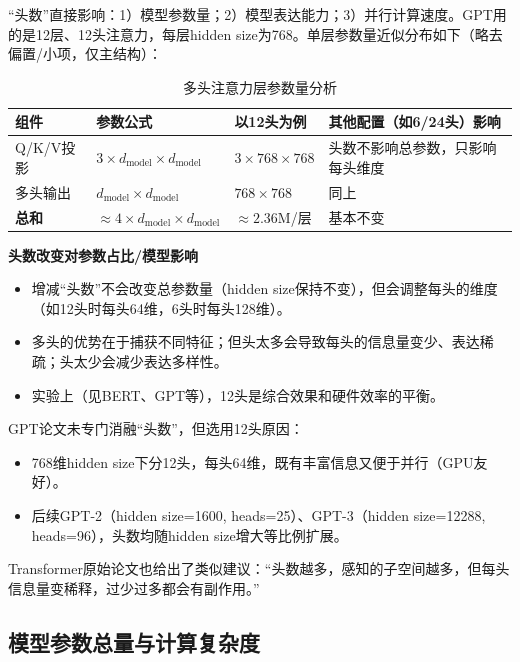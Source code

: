 \documentclass[a4paper,12pt]{article}
\begin{document}
“头数”直接影响：1）模型参数量；2）模型表达能力；3）并行计算速度。GPT用的是12层、12头注意力，每层hidden size为768。单层参数量近似分布如下（略去偏置/小项，仅主结构）：

\begin{table}[H]
    \centering
    \begin{tabularx}{\textwidth}{|l|X|X|X|}
        \hline
        \textbf{组件} & \textbf{参数公式} & \textbf{以12头为例} & \textbf{其他配置（如6/24头）影响} \\
        \hline
        Q/K/V投影 & $3 \times d_\text{model} \times d_\text{model}$ & $3 \times 768 \times 768$ & 头数不影响总参数，只影响每头维度 \\
        \hline
        多头输出 & $d_\text{model} \times d_\text{model}$ & $768 \times 768$ & 同上 \\
        \hline
        \textbf{总和} & $\approx 4 \times d_\text{model} \times d_\text{model}$ & $\approx 2.36$M/层 & 基本不变 \\
        \hline
    \end{tabularx}
    \caption{多头注意力层参数量分析}
    \label{tab:multihead_attention_params}
\end{table}

\textbf{头数改变对参数占比/模型影响}

\begin{itemize}
    \item 增减“头数”不会改变总参数量（hidden size保持不变），但会调整每头的维度（如12头时每头64维，6头时每头128维）。
    \item 多头的优势在于捕获不同特征；但头太多会导致每头的信息量变少、表达稀疏；头太少会减少表达多样性。
    \item 实验上（见BERT、GPT等），12头是综合效果和硬件效率的平衡。
\end{itemize}


GPT论文未专门消融“头数”，但选用12头原因：

\begin{itemize}
    \item 768维hidden size下分12头，每头64维，既有丰富信息又便于并行（GPU友好）。
    \item 后续GPT-2（hidden size=1600, heads=25）、GPT-3（hidden size=12288, heads=96），头数均随hidden size增大等比例扩展。
\end{itemize}

Transformer原始论文也给出了类似建议：“头数越多，感知的子空间越多，但每头信息量变稀释，过少过多都会有副作用。”

\subsection{模型参数总量与计算复杂度}
\end{document}

